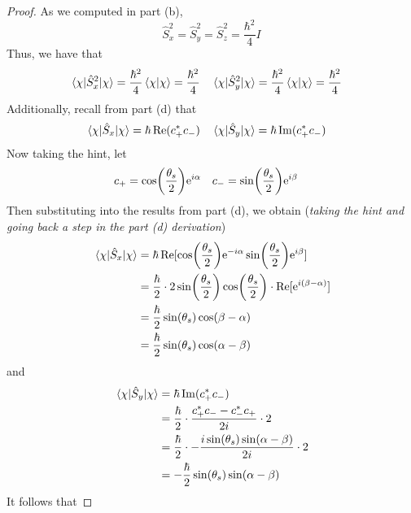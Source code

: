 \documentclass[../psets.tex]{subfiles}
\begin{document}
\begin{enumerate}
\begin{enumerate}
\begin{proof}
            As we computed in part (b),
            \begin{equation*}
                \hat{S}_x^2 = \hat{S}_y^2
                = \hat{S}_z^2
                = \frac{\hbar^2}{4}I
            \end{equation*}
            Thus, we have that
            \begin{align*}
                \ev{\hat{S}_x^2}{\chi} &= \frac{\hbar^2}{4}\braket{\chi} = \frac{\hbar^2}{4}&
                \ev{\hat{S}_y^2}{\chi} &= \frac{\hbar^2}{4}\braket{\chi} = \frac{\hbar^2}{4}
            \end{align*}
            Additionally, recall from part (d) that
            \begin{align*}
                \ev{\hat{S}_x}{\chi} &= \hbar\re(c_+^*c_-)&
                \ev{\hat{S}_y}{\chi} &= \hbar\im(c_+^*c_-)
            \end{align*}
            Now taking the hint, let
            \begin{align*}
                c_+ &= \cos(\frac{\theta_s}{2})\e[i\alpha]&
                c_- &= \sin(\frac{\theta_s}{2})\e[i\beta]
            \end{align*}
            Then substituting into the results from part (d), we obtain (\emph{taking the hint and going back a step in the part (d) derivation})
            \begin{align*}
                \ev{\hat{S}_x}{\chi} &= \hbar\re[\cos(\frac{\theta_s}{2})\e[-i\alpha]\sin(\frac{\theta_s}{2})\e[i\beta]]\\
                &= \frac{\hbar}{2}\cdot 2\sin(\frac{\theta_s}{2})\cos(\frac{\theta_s}{2})\cdot\re[\e[i(\beta-\alpha)]]\\
                &= \frac{\hbar}{2}\sin(\theta_s)\cos(\beta-\alpha)\\
                &= \frac{\hbar}{2}\sin(\theta_s)\cos(\alpha-\beta)
            \end{align*}
            and
            \begin{align*}
                \ev{\hat{S}_y}{\chi} &= \hbar\im(c_+^*c_-)\\
                &= \frac{\hbar}{2}\cdot\frac{c_+^*c_--c_-^*c_+}{2i}\cdot 2\\
                &= \frac{\hbar}{2}\cdot -\frac{i\sin(\theta_s)\sin(\alpha-\beta)}{2i}\cdot 2\\
                &= -\frac{\hbar}{2}\sin(\theta_s)\sin(\alpha-\beta)
            \end{align*}
            It follows that

\end{proof}
\end{enumerate}
\end{enumerate}
\end{document}
